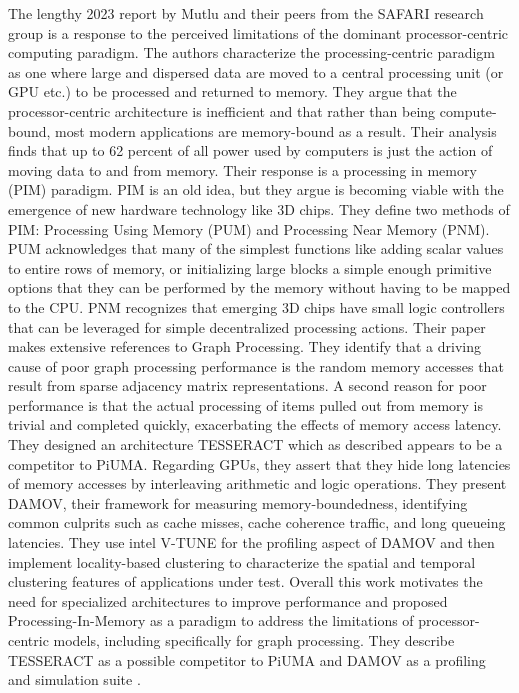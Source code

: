 \par{The lengthy 2023 report by Mutlu and their peers from the SAFARI research group is a response to the perceived limitations of the dominant processor-centric computing paradigm. 
The authors characterize the processing-centric paradigm as one where large and dispersed data are moved to a central processing unit (or GPU etc.) to be processed and returned to memory. 
They argue that the processor-centric architecture is inefficient and that rather than being compute-bound, most modern applications are memory-bound as a result. 
Their analysis finds that up to 62 percent of all power used by computers is just the action of moving data to and from memory. Their response is a processing in memory (PIM) paradigm. 
PIM is an old idea, but they argue is becoming viable with the emergence of new hardware technology like 3D chips. 
They define two methods of PIM: Processing Using Memory (PUM) and Processing Near Memory (PNM). 
PUM acknowledges that many of the simplest functions like adding scalar values to entire rows of memory, or initializing large blocks a simple enough primitive options that they can be performed by the memory without having to be mapped to the CPU. 
PNM recognizes that emerging 3D chips have small logic controllers that can be leveraged for simple decentralized processing actions. 
Their paper makes extensive references to Graph Processing. 
They identify that a driving cause of poor graph processing performance is the random memory accesses that result from sparse adjacency matrix representations. 
A second reason for poor performance is that the actual processing of items pulled out from memory is trivial and completed quickly, exacerbating the effects of memory access latency. 
They designed an architecture TESSERACT which as described appears to be a competitor to PiUMA. 
Regarding GPUs, they assert that they hide long latencies of memory accesses by interleaving arithmetic and logic operations. 
They present DAMOV, their framework for measuring memory-boundedness, identifying common culprits such as cache misses, cache coherence traffic, and long queueing latencies. 
They use intel V-TUNE for the profiling aspect of DAMOV and then implement locality-based clustering to characterize the spatial and temporal clustering features of applications under test. 
Overall this work motivates the need for specialized architectures to improve performance and proposed Processing-In-Memory as a paradigm to address the limitations of processor-centric models, including specifically for graph processing. 
They describe TESSERACT as a possible competitor to PiUMA and DAMOV as a profiling and simulation suite \cite{Mutlu2023}.}



